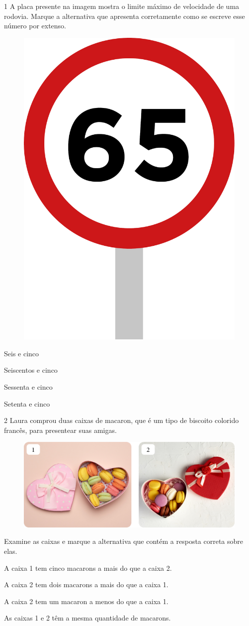 
\num{1} A placa presente na imagem mostra o limite máximo de velocidade de uma
rodovia. Marque a alternativa que apresenta corretamente como se escreve
esse número por extenso.

\begin{figure}[htpb!]
\centering
\includegraphics[width=.2\textwidth]{./media/image151.png}
\end{figure}

\begin{escolha}
\item Seis e cinco

\item Seiscentos e cinco

\item Sessenta e cinco

\item Setenta e cinco
\end{escolha}

\num{2} Laura comprou duas caixas de macaron, que é um tipo de biscoito colorido
francês, para presentear suas amigas. 

\begin{figure}[htpb!]
\includegraphics[width=\textwidth]{./media/image152.png}
\end{figure}

\pagebreak
Examine as caixas e marque a
alternativa que contém a resposta correta sobre elas.

\begin{escolha}
\item A caixa 1 tem cinco macarons a mais do que a caixa 2.

\item A caixa 2 tem dois macarons a mais do que a caixa 1.

\item A caixa 2 tem um macaron a menos do que a caixa 1.

\item As caixas 1 e 2 têm a mesma quantidade de macarons.
\end{escolha}


